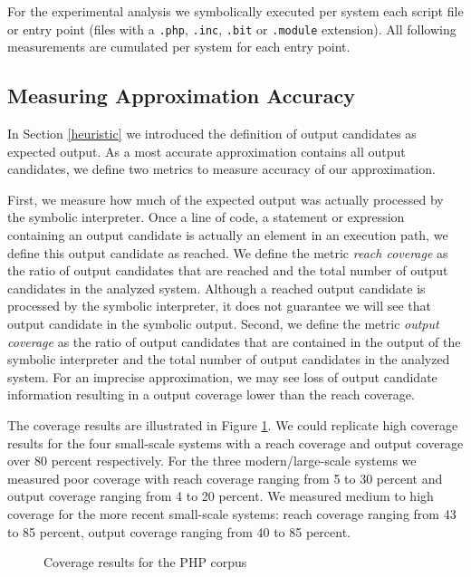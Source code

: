 \documentclass[preprint]{sig-alternate-05-2015}
\begin{document}
For the experimental analysis we symbolically executed per system each script file or entry point (files with a \texttt{.php}, \texttt{.inc}, \texttt{.bit} or \texttt{.module} extension). All following measurements are cumulated per system for each entry point. 

\subsection{Measuring Approximation Accuracy}
\label{HowAccurateIsOurApproximation} 
In Section \ref{heuristic} we introduced the definition of output candidates as expected output. As a most accurate approximation contains all output candidates, we define two metrics to measure accuracy of our approximation. 

First, we measure how much of the expected output was actually processed by the symbolic interpreter.  Once a line of code, a statement or expression containing an output candidate is actually an element in an execution path, we define this output candidate as reached. We define the metric \emph{reach coverage} as the ratio of output candidates that are reached and the total number of output candidates in the analyzed system. Although a reached output candidate is processed by the symbolic interpreter, it does not guarantee we will see that output candidate in the symbolic output. Second, we define the metric \emph{output coverage} as the ratio of output candidates that are contained in the output of the symbolic interpreter and the total number of output candidates in the analyzed system.  For an imprecise approximation, we may see loss of output candidate information resulting in a output coverage lower than the reach coverage.

The coverage results are illustrated in Figure \ref{coverage}. We could replicate high coverage results for the four small-scale systems with a reach coverage and output coverage over 80 percent respectively. For the three modern/large-scale systems we measured poor coverage with reach coverage ranging from 5 to 30 percent and output coverage ranging from 4 to 20 percent. We measured medium to high coverage for the more recent small-scale systems: reach coverage ranging from 43 to 85 percent, output coverage ranging from 40 to 85 percent.
\begin{figure}
	\centering	
	\resizebox{0.4\textwidth}{!}{%
			
	}
	\caption{Coverage results for the PHP corpus}
	\label{coverage}
\end{figure}
\end{document}
